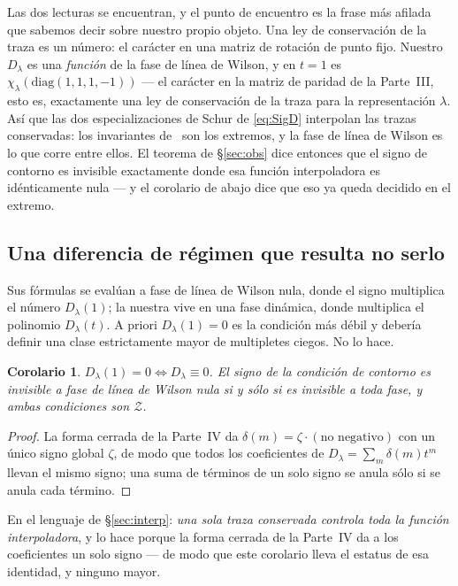 \documentclass[11pt,a4paper]{article}
\newtheorem{corollary}{Corolario}
\newcommand{\Dl}{D_\lambda}
\begin{document}
Las dos lecturas se encuentran, y el punto de encuentro es la frase más afilada que sabemos decir
sobre nuestro propio objeto. Una ley de conservación de la traza es un número: el carácter en una
matriz de rotación de punto fijo. Nuestro $\Dl$ es una \emph{función} de la fase de línea de Wilson,
y en $t=1$ es $\chi_\lambda(\mathrm{diag}(1,1,1,-1))$ --- el carácter en la matriz de paridad de la
Parte~III, esto es, exactamente una ley de conservación de la traza para la representación $\lambda$.
Así que las dos especializaciones de Schur de \eqref{eq:SigD} interpolan las trazas conservadas: los
invariantes de~\cite{TI1,TI2} son los extremos, y la fase de línea de Wilson es lo que corre entre
ellos. El teorema de \S\ref{sec:obs} dice entonces que el signo de contorno es invisible exactamente
donde esa función interpoladora es idénticamente nula --- y el corolario de abajo dice que eso ya
queda decidido en el extremo.

\subsection*{Una diferencia de régimen que resulta no serlo}

Sus fórmulas se evalúan a fase de línea de Wilson nula, donde el signo multiplica el número $\Dl(1)$;
la nuestra vive en una fase dinámica, donde multiplica el polinomio $\Dl(t)$. A priori $\Dl(1)=0$ es
la condición más débil y debería definir una clase estrictamente mayor de multipletes ciegos. No lo
hace.

\begin{corollary}\label{cor:regime}
$\Dl(1)=0\iff\Dl\equiv0$. El signo de la condición de contorno es invisible a fase de línea de Wilson
nula si y sólo si es invisible a toda fase, y ambas condiciones son $\mathcal Z$.
\end{corollary}

\begin{proof}
La forma cerrada de la Parte~IV da $\delta(m)=\zeta\cdot(\text{no negativo})$ con un único signo
global $\zeta$, de modo que todos los coeficientes de $\Dl=\sum_m\delta(m)t^m$ llevan el mismo signo;
una suma de términos de un solo signo se anula sólo si se anula cada término.
\end{proof}

\noindent En el lenguaje de \S\ref{sec:interp}: \emph{una sola traza conservada controla toda la
función interpoladora}, y lo hace porque la forma cerrada de la Parte~IV da a los coeficientes un
solo signo --- de modo que este corolario lleva el estatus de esa identidad, y ninguno mayor.
\end{document}
